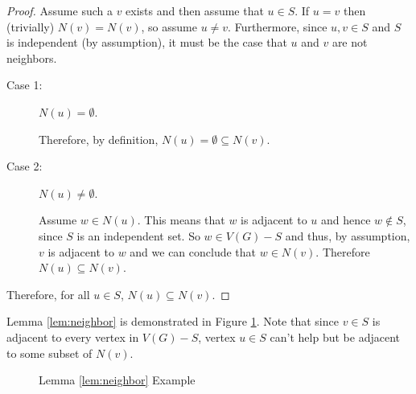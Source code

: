 \begin{proof}
  Assume such a \(v\) exists and then assume that \(u\in S\).  If \(u=v\) then (trivially) \(N(v)=N(v)\), so assume
  \(u\ne v\).  Furthermore, since \(u,v\in S\) and \(S\) is independent (by assumption), it must be the case that
  \(u\) and \(v\) are not neighbors.

  \begin{description}
  \item[Case 1:] \(N(u)=\emptyset\).
      
    Therefore, by definition, \(N(u)=\emptyset\subseteq N(v)\).

  \item[Case 2:] \(N(u)\ne\emptyset\).

    Assume \(w\in N(u)\).  This means that \(w\) is adjacent to \(u\) and hence \(w\notin S\), since \(S\) is an
    independent set.  So \(w\in V(G)-S\) and thus, by assumption, \(v\) is adjacent to \(w\) and we can conclude
    that \(w\in N(v)\).  Therefore \(N(u)\subseteq N(v)\).
  \end{description}

  Therefore, for all \(u\in S\), \(N(u)\subseteq N(v)\).
\end{proof}

Lemma \ref{lem:neighbor} is demonstrated in Figure \ref{fig:neighbor}.  Note that since \(v\in S\) is adjacent to
every vertex in \(V(G)-S\), vertex \(u\in S\) can't help but be adjacent to some subset of \(N(v)\).

\begin{figure}[h]
  \label{fig:neighbor}
  \begin{center}
  \end{center}
  \caption{Lemma \ref{lem:neighbor} Example}
\end{figure}

